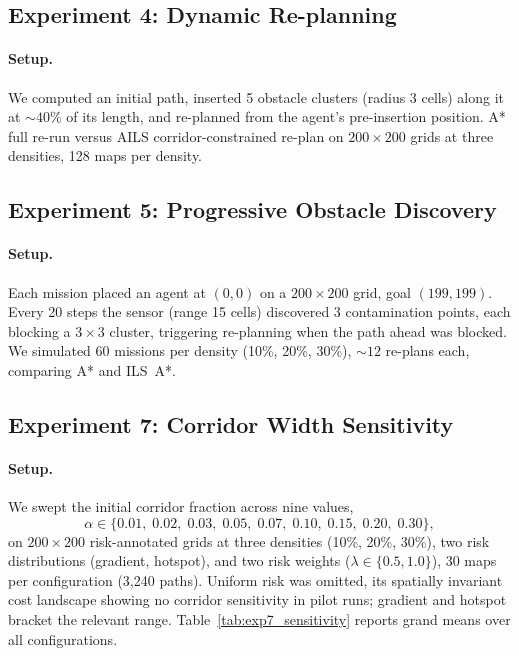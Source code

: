 \documentclass[preprint,12pt,authoryear]{elsarticle}
\begin{document}
\subsection{Experiment 4: Dynamic Re-planning}

\paragraph{Setup.}
We computed an initial path, inserted 5 obstacle clusters (radius 3 cells) along it at ${\sim}40\%$ of its length, and re-planned from the agent's pre-insertion position. A* full re-run versus AILS corridor-constrained re-plan on $200 \times 200$ grids at three densities, 128 maps per density.

\subsection{Experiment 5: Progressive Obstacle Discovery}

\paragraph{Setup.}
Each mission placed an agent at $(0,0)$ on a $200 \times 200$ grid, goal $(199, 199)$. Every 20 steps the sensor (range 15 cells) discovered 3 contamination points, each blocking a $3 \times 3$ cluster, triggering re-planning when the path ahead was blocked. We simulated 60 missions per density (10\%, 20\%, 30\%), ${\sim}12$ re-plans each, comparing A* and ILS~A*.

\subsection{Experiment 7: Corridor Width Sensitivity}

\paragraph{Setup.}
We swept the initial corridor fraction across nine values,
\[
\alpha \in \{0.01,\; 0.02,\; 0.03,\; 0.05,\; 0.07,\; 0.10,\; 0.15,\; 0.20,\; 0.30\},
\]
on $200 \times 200$ risk-annotated grids at three densities (10\%, 20\%, 30\%), two risk distributions (gradient, hotspot), and two risk weights ($\lambda \in \{0.5, 1.0\}$), 30 maps per configuration (3,240 paths). Uniform risk was omitted, its spatially invariant cost landscape showing no corridor sensitivity in pilot runs; gradient and hotspot bracket the relevant range. Table~\ref{tab:exp7_sensitivity} reports grand means over all configurations.
\end{document}
